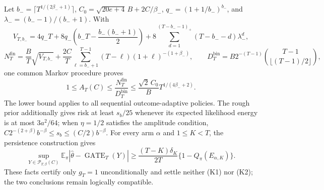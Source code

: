 Let \(b_-=\lceil T^{1/(2\beta_-+1)}\rceil\), \(C_0=\sqrt{20e+4}\,B+2C/\beta_-\), \(q_-=(1+1/b_-)^{b_-}\), and \(\lambda_-=(b_--1)/(b_-+1)\). With \[V_{T,b_-}=4q_-T+8q_-\left(b_-T-\frac{b_-(b_-+1)}2\right)+8\sum_{d=1}^{(T-b_--1)_+}(T-b_--d)\lambda_-^d,\] \[N_T^{\mathrm{fin}}=\frac BT\sqrt{V_{T,b_-}}+\frac{2C}{T}\sum_{\ell=b_-+1}^{T-1}(T-\ell)(1+\ell)^{-(1+\beta_-)},\qquad D_T^{\mathrm{bin}}=B2^{-(T-1)}\binom{T-1}{\lfloor(T-1)/2\rfloor},\] one common Markov procedure proves \[1\le A_T(C)\le\frac{N_T^{\mathrm{fin}}}{D_T^{\mathrm{bin}}}\le\frac{\sqrt2\,C_0}{B}T^{1/(4\beta_-+2)}.\] The lower bound applies to all sequential outcome-adaptive policies. The rough prior additionally gives risk at least \(s_b/25\) whenever its expected likelihood energy is at most \(3a^2/64\); when \(\eta=1/2\) satisfies the amplitude condition, \(C2^{-(2+\beta)}b^{-\beta}\le s_b\le(C/2)b^{-\beta}\). For every arm \(\alpha\) and \(1\le K<T\), the persistence construction gives \[\sup_{Y\in\mathcal P_{T,\beta}(C)}\mathbb E_\pi|\widehat\theta-\operatorname{GATE}_T(Y)|\ge\frac{(T-K)\delta_K}{2T}\{1-Q_\pi(E_{\alpha,K})\}.\] These facts certify only \(g_T=1\) unconditionally and settle neither (K1) nor (K2); the two conclusions remain logically compatible.